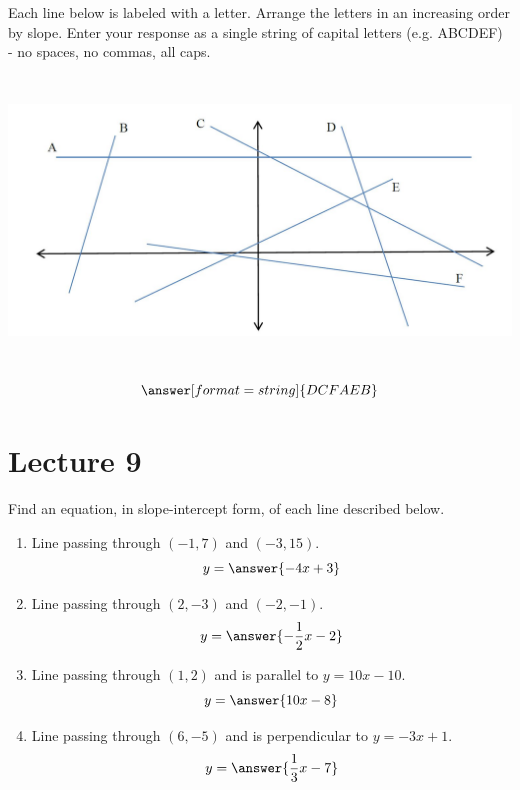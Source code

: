 \documentclass{ximera}
\begin{document}
 \begin{problem}\label{prob:160hom4prob2} 
 Each line below is labeled with a letter.  Arrange the letters in an increasing order by slope.  Enter your response as a single string of capital letters (e.g. ABCDEF) - no spaces, no commas, all caps.
 
 \begin{image}
   \includegraphics[height=3in]{160H4pic1.jpg}
 \end{image}
 $$\answer[format=string]{DCFAEB}$$
 \end{problem}
 \section{Lecture 9}
\begin{problem}\label{prob:160hom4prob3}
Find an equation, in slope-intercept form, of each line described below.
  \begin{enumerate}
      \item Line passing through $(-1, 7)$ and $(-3, 15)$.
      $$y=\answer{-4x+3}$$
      \item Line passing through $(2, -3)$ and $(-2, -1)$.
      $$y=\answer{-\frac{1}{2}x-2}$$
      \item Line passing through $(1,2)$ and is parallel to $y=10x-10$.
      $$y=\answer{10x-8}$$
      \item Line passing through $(6, -5)$ and is perpendicular to $y=-3x+1$.
      $$y=\answer{\frac{1}{3}x-7}$$
  \end{enumerate}
\end{problem}
\end{document}
